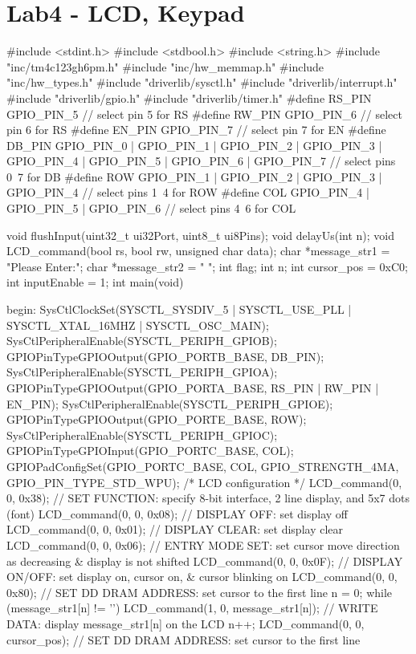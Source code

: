 \documentclass[12pt, a4paper]{article}
\begin{document}
\pagebreak
\section{Lab4 - LCD, Keypad}
\begin{code}
#include <stdint.h>
#include <stdbool.h>
#include <string.h>
#include "inc/tm4c123gh6pm.h"
#include "inc/hw_memmap.h"
#include "inc/hw_types.h"
#include "driverlib/sysctl.h"
#include "driverlib/interrupt.h"
#include "driverlib/gpio.h"
#include "driverlib/timer.h"
#define RS_PIN GPIO_PIN_5   // select pin 5 for RS
#define RW_PIN GPIO_PIN_6   // select pin 6 for RS
#define EN_PIN GPIO_PIN_7   // select pin 7 for EN
#define DB_PIN GPIO_PIN_0 | GPIO_PIN_1 | GPIO_PIN_2 | GPIO_PIN_3 | GPIO_PIN_4 | GPIO_PIN_5 | GPIO_PIN_6 | GPIO_PIN_7                            // select pins 0~7 for DB
#define ROW GPIO_PIN_1 | GPIO_PIN_2 | GPIO_PIN_3 | GPIO_PIN_4           // select pins 1~4 for ROW
#define COL GPIO_PIN_4 | GPIO_PIN_5 | GPIO_PIN_6                        // select pins 4~6 for COL

void flushInput(uint32_t ui32Port, uint8_t ui8Pins);
void delayUs(int n);
void LCD_command(bool rs, bool rw, unsigned char data);
char *message_str1 = "Please Enter:";
char *message_str2 = "                    ";
int flag;
int n;
int cursor_pos = 0xC0;
int inputEnable = 1;
int main(void)
{
begin:
    SysCtlClockSet(SYSCTL_SYSDIV_5 | SYSCTL_USE_PLL | SYSCTL_XTAL_16MHZ | SYSCTL_OSC_MAIN);
    SysCtlPeripheralEnable(SYSCTL_PERIPH_GPIOB);
    GPIOPinTypeGPIOOutput(GPIO_PORTB_BASE, DB_PIN);
    SysCtlPeripheralEnable(SYSCTL_PERIPH_GPIOA);
    GPIOPinTypeGPIOOutput(GPIO_PORTA_BASE, RS_PIN | RW_PIN | EN_PIN);
    SysCtlPeripheralEnable(SYSCTL_PERIPH_GPIOE);
    GPIOPinTypeGPIOOutput(GPIO_PORTE_BASE, ROW);
    SysCtlPeripheralEnable(SYSCTL_PERIPH_GPIOC);
    GPIOPinTypeGPIOInput(GPIO_PORTC_BASE, COL);
    GPIOPadConfigSet(GPIO_PORTC_BASE, COL, GPIO_STRENGTH_4MA, GPIO_PIN_TYPE_STD_WPU);
    /* LCD configuration */
    LCD_command(0, 0, 0x38); // SET FUNCTION: specify 8-bit interface, 2 line display, and 5x7 dots (font)
    LCD_command(0, 0, 0x08); // DISPLAY OFF: set display off
    LCD_command(0, 0, 0x01); // DISPLAY CLEAR: set display clear
    LCD_command(0, 0, 0x06); // ENTRY MODE SET: set cursor move direction as decreasing & display is not shifted
    LCD_command(0, 0, 0x0F); // DISPLAY ON/OFF: set display on, cursor on, & cursor blinking on
    LCD_command(0, 0, 0x80); // SET DD DRAM ADDRESS: set cursor to the first line
    n = 0;
    while (message_str1[n] != '\0')
    {
        LCD_command(1, 0, message_str1[n]); // WRITE DATA: display message_str1[n] on the LCD
        n++;
    }
    LCD_command(0, 0, cursor_pos); // SET DD DRAM ADDRESS: set cursor to the first line

}
\end{code}
\end{document}
